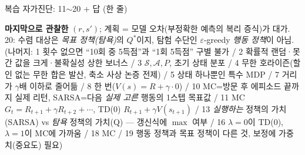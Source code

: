 \begin{frame}{복습 자가진단: 11$\sim$20 + 답 (한 줄)}
{\begin{itemize}
{  \textbf{마지막으로 관찰한} $(r,s')$; 계획 = 모델 오차(부정확한
  예측의 복리 증식)가 대가. 20: 수렴 대상은 \emph{목표 정책(탐욕)}의
  $Q^*$이지, 탐험 수단인 $\varepsilon$-greedy \emph{행동 정책}이 아님.
  (나머지: 1 횟수 없으면 ``10회 중 5득점''과 ``1회 5득점'' 구별 불가 /
  2 확률적 랜덤·못 간 값을 크게·불확실성 상한 보너스 / 3 $\mathcal
  S,\mathcal A,P$, 초기 상태 분포 / 4 무한 호라이즌(할인 없는 무한
  합은 발산, 축소 사상 논증 전제) / 5 상태 하나뿐인 특수 MDP / 7
  거리가 $\gamma$배 이하로 줄어듦 / 8 한 번($V(s)=R+\gamma\cdot 0$) /
  10 MC=방문 후 에피소드 끝까지 실제 리턴, SARSA=다음 \emph{실제 고른}
  행동의 1스텝 목표값 / 11 MC $G_t=R_{t+1}+\gamma R_{t+2}+\cdots$,
  TD(0) $R_{t+1}+\gamma V(s_{t+1})$ / 13 \emph{실행하는} 정책의 가치
  (SARSA) vs \emph{탐욕} 정책의 가치(Q) --- 갱신식에 $\max$ 여부 /
  16 $\lambda=0$이 TD(0), $\lambda=1$이 MC에 가까움 / 18 MC /
  19 행동 정책과 목표 정책이 다른 것, 보정에 가중치(중요도) 필요)}
\end{itemize}}
\end{frame}
